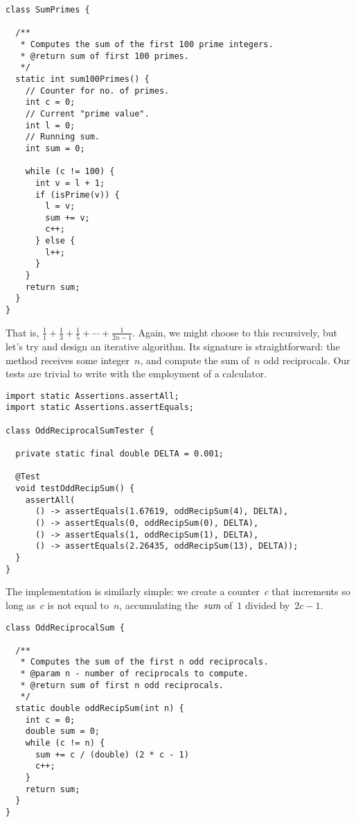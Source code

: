 \begin{lstlisting}[language=MyJava]
class SumPrimes {

  /**
   * Computes the sum of the first 100 prime integers.
   * @return sum of first 100 primes.
   */
  static int sum100Primes() {
    // Counter for no. of primes.
    int c = 0;   
    // Current "prime value".
    int l = 0;   
    // Running sum.
    int sum = 0; 
    
    while (c != 100) {
      int v = l + 1;
      if (isPrime(v)) {
        l = v;
        sum += v;
        c++;
      } else {
        l++;
      }
    }
    return sum;
  }
}
\end{lstlisting}

That is, $\frac{1}{1} + \frac{1}{3} + \frac{1}{5} + \cdots + \frac{1}{2n-1}$. 
Again, we might choose to this recursively, but let's try and design an iterative algorithm. 
Its signature is straightforward: the method receives some integer~$n$, and compute the sum of~$n$ odd reciprocals. 
Our tests are trivial to write with the employment of a calculator.


\begin{lstlisting}[language=MyJava]
import static Assertions.assertAll;
import static Assertions.assertEquals;

class OddReciprocalSumTester {

  private static final double DELTA = 0.001;

  @Test
  void testOddRecipSum() {
    assertAll(
      () -> assertEquals(1.67619, oddRecipSum(4), DELTA),
      () -> assertEquals(0, oddRecipSum(0), DELTA),
      () -> assertEquals(1, oddRecipSum(1), DELTA),
      () -> assertEquals(2.26435, oddRecipSum(13), DELTA));
  }
}
\end{lstlisting}

The implementation is similarly simple: we create a counter~$c$ that increments so long as~$c$ is not equal to~$n$, accumulating the~$\emph{sum}$ of~$1$ divided by~$2c-1$.

\begin{lstlisting}[language=MyJava]
class OddReciprocalSum {

  /**
   * Computes the sum of the first n odd reciprocals.
   * @param n - number of reciprocals to compute.
   * @return sum of first n odd reciprocals.
   */
  static double oddRecipSum(int n) {
    int c = 0;
    double sum = 0;
    while (c != n) {
      sum += c / (double) (2 * c - 1)
      c++;
    }
    return sum;
  }
}
\end{lstlisting}

